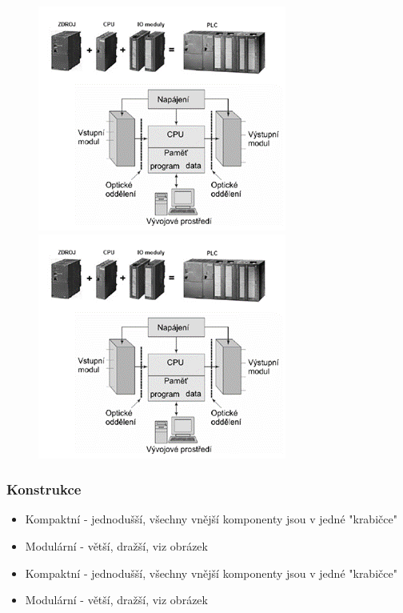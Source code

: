 \begin{figure}[h]
  \begin{center}
    \includegraphics[scale = 1]{img/Picture13.png}
  \end{center}
    \begin{center}
        \includegraphics[scale = 1]{img/Picture13.png}
    \end{center}
\end{figure}

\subsubsection*{Konstrukce}
\begin{itemize}
  \item Kompaktní - jednodušší, všechny vnější komponenty jsou v jedné "krabičce"
  \item Modulární - větší, dražší, viz obrázek
    \item Kompaktní - jednodušší, všechny vnější komponenty jsou v jedné "krabičce"
    \item Modulární - větší, dražší, viz obrázek
\end{itemize}


